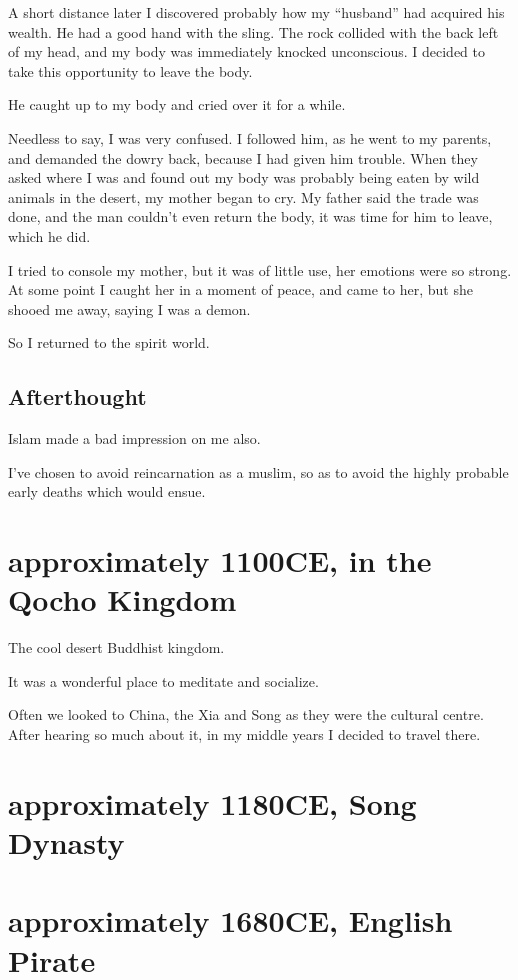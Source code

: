 A short distance later I discovered probably how my ``husband'' had acquired his
wealth. He had a good hand with the sling. The rock collided with the back left
of my head, and my body was immediately knocked unconscious. I decided to take
this opportunity to leave the body.

He caught up to my body and cried over it for a while.

Needless to say, I was very confused. I followed him, as he went to my parents,
and demanded the dowry back, because I had given him trouble. When they asked
where I was and found out my body was probably being eaten by wild animals in
the desert, my mother began to cry. My father said the trade was done, and the
man couldn't even return the body, it was time for him to leave, which he did.

I tried to console my mother, but it was of little use, her emotions were so
strong. At some point I caught her in a moment of peace, and came to her, but
she shooed me away, saying I was a demon.

So I returned to the spirit world.

\section{Afterthought}

Islam made a bad impression on me also. 

I've chosen to avoid reincarnation as a muslim, so as to avoid the highly
probable early deaths which would ensue. 

\chapter{approximately 1100CE, in the Qocho Kingdom}
The cool desert Buddhist kingdom.

It was a wonderful place to meditate and socialize. 

Often we looked to China, the Xia and Song as they were the cultural centre. 
After hearing so much about it, in my middle years I decided to travel there.

\chapter{approximately 1180CE, Song Dynasty}

\chapter{approximately 1680CE, English Pirate}\label{reincarnation:pirate}

